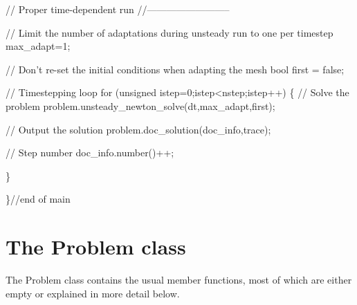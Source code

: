 \begin{DoxyCodeInclude}



 \textcolor{comment}{// Proper time-dependent run}
 \textcolor{comment}{//--------------------------}

 \textcolor{comment}{// Limit the number of adaptations during unsteady run to one per timestep}
 max\_adapt=1;
 
 \textcolor{comment}{// Don't re-set the initial conditions when adapting the mesh}
 \textcolor{keywordtype}{bool} first = \textcolor{keyword}{false};

 \textcolor{comment}{// Timestepping loop}
 \textcolor{keywordflow}{for} (\textcolor{keywordtype}{unsigned} istep=0;istep<nstep;istep++)
  \{ 
   \textcolor{comment}{// Solve the problem}
   problem.unsteady\_newton\_solve(dt,max\_adapt,first);
   
   \textcolor{comment}{// Output the solution}
   problem.doc\_solution(doc\_info,trace);
   
   \textcolor{comment}{// Step number}
   doc\_info.number()++;

  \}

\}\textcolor{comment}{//end of main}

\end{DoxyCodeInclude}




 

\hypertarget{index_problem}{}\section{The Problem class}\label{index_problem}
The {\ttfamily Problem} class contains the usual member functions, most of which are either empty or explained in more detail below.

